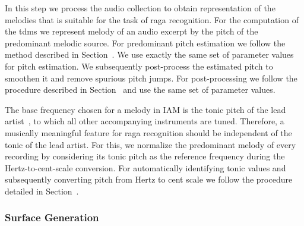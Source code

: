 In this step we process the audio collection to obtain representation of the melodies that is suitable for the task of \gls{raga} recognition. For the computation of the \gls{tdms} we represent melody of an audio excerpt by the pitch of the predominant melodic source. For predominant pitch estimation we follow the method described in Section~. We use exactly the same set of parameter values for pitch estimation. We subsequently post-process the estimated pitch to smoothen it and remove spurious pitch jumps. For post-processing we follow the procedure described in Section~ and use the same set of parameter values.

The base frequency chosen for a melody in IAM is the tonic pitch of the lead artist~\cite{Gulati2014Tonic}, to which all other accompanying instruments are tuned. Therefore, a musically meaningful feature for \gls{raga} recognition should be independent of the tonic of the lead artist. For this, we normalize the predominant melody of every recording by considering its tonic pitch as the reference frequency during the Hertz-to-cent-scale conversion. For automatically identifying tonic values and subsequently converting pitch from Hertz to cent scale we follow the procedure detailed in Section~.


\subsubsection{Surface Generation}
\label{sec:tdms_surface_generation}

